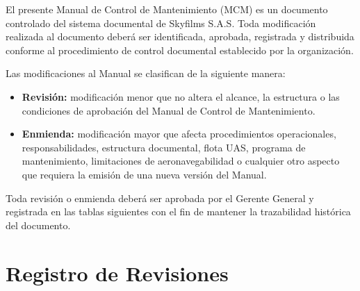 

El presente Manual de Control de Mantenimiento (MCM) es un documento controlado del sistema documental de Skyfilms S.A.S. Toda modificación realizada al documento deberá ser identificada, aprobada, registrada y distribuida conforme al procedimiento de control documental establecido por la organización.

Las modificaciones al Manual se clasifican de la siguiente manera:

\begin{itemize}
    \item \textbf{Revisión:} modificación menor que no altera el alcance, la estructura o las condiciones de aprobación del Manual de Control de Mantenimiento.
    
    \item \textbf{Enmienda:} modificación mayor que afecta procedimientos operacionales, responsabilidades, estructura documental, flota UAS, programa de mantenimiento, limitaciones de aeronavegabilidad o cualquier otro aspecto que requiera la emisión de una nueva versión del Manual.
\end{itemize}

Toda revisión o enmienda deberá ser aprobada por el Gerente General y registrada en las tablas siguientes con el fin de mantener la trazabilidad histórica del documento.

\vspace{0.7cm}


\section*{Registro de Revisiones}

\renewcommand{\arraystretch}{1.35}

